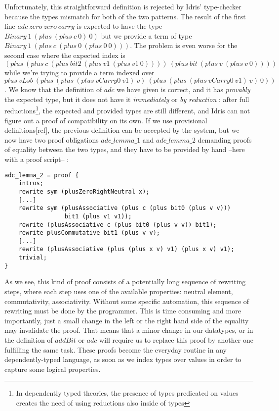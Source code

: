 Unfortunately, this straightforward definition is rejected by Idris' type-checker because the types mismatch for both of the two patterns. The result of the first line $adc\ zero\ zero\ carry$ is expected to have the type $Binary\ 1\ (plus\ (plus\ c\ 0)\ 0)$ but we provide a term of type $Binary\ 1\ (plus\ c\ (plus\ 0\ (plus\ 0\ 0)))$.
The problem is even worse for the second case where the expected index is \\
$(plus\ (plus\ c\ (plus\ bit2\ (plus\ v1\ (plus\ v1\ 0))))\ (plus\ bit\ (plus\ v\ (plus\ v\ 0))))$
while we're trying to provide a term indexed over \\
$plus\ vLsb\ (plus\ (plus\ (plus\ vCarry0\ v1)\ v)\ (plus\ (plus\ (plus\ vCarry0\ v1)\ v)\ 0))$.
We know that the definition of $adc$ we have given is correct, and it has \emph{provably} the expected type, but it does not have it \emph{immediately} or \emph{by reduction} : after full reductions\footnote{In dependently typed theories, the presence of types predicated on values creates the need of using reductions also inside of types}, the expected and provided types are still different, and Idris can not figure out a proof of compatibility on its own. 
If we use provisional definitions[ref], the previous definition can be accepted by the system, but we now have two proof obligations $adc\_lemma\_1$ and $adc\_lemma\_2$ demanding proofs of equality between the two types, and they have to be provided by hand --here with a proof script-- :

\begin{lstlisting}
adc_lemma_2 = proof {
    intros;
    rewrite sym (plusZeroRightNeutral x);
    [...]
    rewrite sym (plusAssociative (plus c (plus bit0 (plus v v))) 
                 bit1 (plus v1 v1));
    rewrite (plusAssociative c (plus bit0 (plus v v)) bit1);
    rewrite plusCommutative bit1 (plus v v);
    [...]
    rewrite (plusAssociative (plus (plus x v) v1) (plus x v) v1);
    trivial;
}
\end{lstlisting}

As we see, this kind of proof consists of a potentially long sequence of rewriting steps, where each step uses one of the available properties: neutral element, commutativity, associativity. Without some specific automation, this sequence of rewriting must be done by the programmer.
This is time consuming and more importantly, just a small change in the left or the right hand side of the equality may invalidate the proof. That means that a minor change in our datatypes, or in the definition of $addBit$ or $adc$ will require us to replace this proof by another one fulfilling the same task.
These proofs become the everyday routine in any dependently-typed language, as soon as we index types over values in order to capture some logical properties.  

